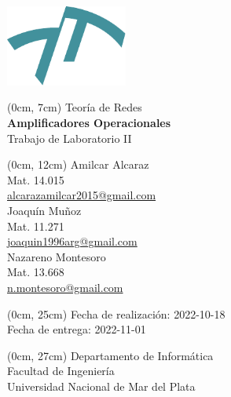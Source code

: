 \newcommand{\materia}[1]{{\huge #1}\\\vspace{0.5cm}}
\newcommand{\titulo}[1]{{\Huge \textbf{#1}}\\\vspace{0.5cm}}
\newcommand{\subtitulo}[1]{{\huge #1}\\\vspace{0.5cm}}
\newcommand{\autor}[3]{#1\\{\small Mat. #2\\\href{mailto:#3}{#3}}\\\vspace{0.7cm}}
\newcommand{\fecha}[4]{{\small Fecha de #1: #4-#3-#2}\\} %
\newcommand{\departamento}[1]{{\small Departamento de #1\\Facultad de Ingeniería\\Universidad Nacional de Mar del Plata}}
\newenvironment{mytitlepage}
    {\pagenumbering{gobble}\begin{center}}
    {\end{center}\newpage\pagenumbering{arabic}}

\begin{mytitlepage}
    \includegraphics[width=4cm]{img/logo-fi.pdf}
   
    \begin{textblock*}{\paperwidth}(0cm, 7cm)
    \materia{Teoría de Redes}
    \titulo{Amplificadores Operacionales}
    \subtitulo{Trabajo de Laboratorio II}
    \end{textblock*}
    
    \begin{textblock*}{\paperwidth}(0cm, 12cm)
    \autor{Amilcar Alcaraz}{14.015}{alcarazamilcar2015@gmail.com}
    \autor{Joaquín Muñoz}{11.271}{joaquin1996arg@gmail.com}
    \autor{Nazareno Montesoro}{13.668}{n.montesoro@gmail.com}
    \end{textblock*}
    
    \begin{textblock*}{\paperwidth}(0cm, 25cm) 
    \fecha{realización}{18}{10}{2022}
    \fecha{entrega}{01}{11}{2022}
    \end{textblock*}
    
    \begin{textblock*}{\paperwidth}(0cm, 27cm) 
    \departamento{Informática}
    \end{textblock*}
\end{mytitlepage}
